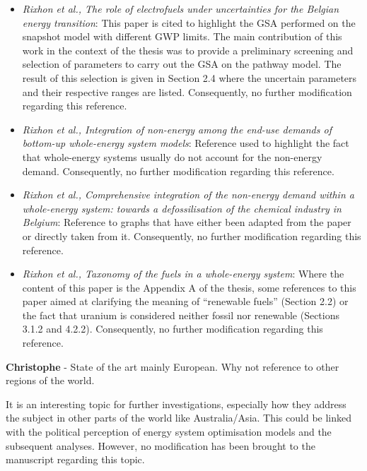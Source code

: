 \documentclass[12pt,a4paper]{article}
\begin{document}
\begin{itemize}
\item \emph{\cite{rixhon2021role} Rixhon et al., The role of electrofuels under uncertainties for the Belgian energy transition}: This paper is cited to highlight the GSA performed on the snapshot model with different GWP limits. The main contribution of this work in the context of the thesis was to provide a preliminary screening and selection of parameters to carry out the GSA on the pathway model. The result of this selection is given in Section 2.4 where the uncertain parameters and their respective ranges are listed. Consequently, no further modification regarding this reference.
\item \emph{\cite{rixhon2022integration} Rixhon et al., Integration of non-energy among the end-use demands of bottom-up whole-energy system models}: Reference used to highlight the fact that whole-energy systems usually do not account for the non-energy demand. Consequently, no further modification regarding this reference.
\item \emph{\cite{rixhon2021comprehensive} Rixhon et al., Comprehensive
integration of the non-energy demand within a whole-energy system: towards a defossilisation of the chemical industry in Belgium}: Reference to graphs that have either been adapted from the paper or directly taken from it. Consequently, no further modification regarding this reference.
\item \emph{\cite{rixhon2021terminology} Rixhon et al., Taxonomy of the fuels in a whole-energy system}: Where the content of this paper is the Appendix A of the thesis, some references to this paper aimed at clarifying the meaning of ``renewable fuels'' (Section 2.2) or the fact that uranium is considered neither fossil nor renewable (Sections 3.1.2 and 4.2.2). Consequently, no further modification regarding this reference.
\end{itemize}


\begin{mdframed}[style=comment] %
{\color{violet} \textbf{Christophe}} - State of the art mainly European. Why not reference to other regions of the world.
\end{mdframed}

\noindent
It is an interesting topic for further investigations, especially how they address the subject in other parts of the world like Australia/Asia. This could be linked with the political perception of energy system optimisation models and the subsequent analyses. However, no modification has been brought to the manuscript regarding this topic.
\end{document}
